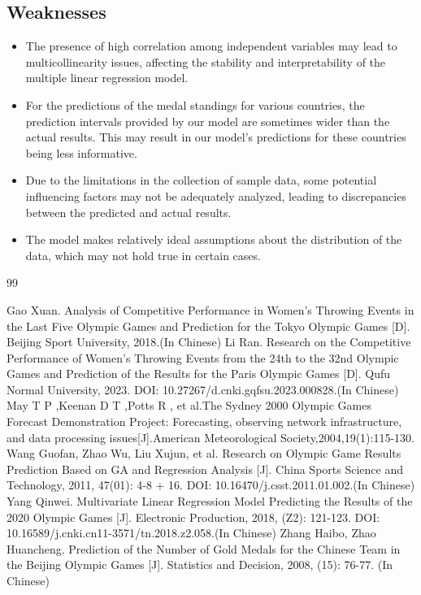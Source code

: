 \documentclass{mcmthesis}
\begin{document}
\subsection{Weaknesses}

\begin{itemize}
\item The presence of high correlation among independent variables may lead to multicollinearity issues, affecting the stability and interpretability of the multiple linear regression model.

\item For the predictions of the medal standings for various countries, the prediction intervals provided by our model are sometimes wider than the actual results. This may result in our model's predictions for these countries being less informative.

\item Due to the limitations in the collection of sample data, some potential influencing factors may not be adequately analyzed, leading to discrepancies between the predicted and actual results.

\item The model makes relatively ideal assumptions about the distribution of the data, which may not hold true in certain cases.
\end{itemize}

\begin{thebibliography}{99}

 Gao Xuan. Analysis of Competitive Performance in Women's Throwing Events in the Last Five Olympic Games and Prediction for the Tokyo Olympic Games [D]. Beijing Sport University, 2018.(In Chinese) 
 Li Ran. Research on the Competitive Performance of Women's Throwing Events from the 24th to the 32nd Olympic Games and Prediction of the Results for the Paris Olympic Games [D]. Qufu Normal University, 2023. DOI: 10.27267/d.cnki.gqfsu.2023.000828.(In Chinese) 
 May T P ,Keenan D T ,Potts R , et al.The Sydney 2000 Olympic Games Forecast Demonstration Project: Forecasting, observing network infrastructure, and data processing issues[J].American Meteorological Society,2004,19(1):115-130.
 Wang Guofan, Zhao Wu, Liu Xujun, et al. Research on Olympic Game Results Prediction Based on GA and Regression Analysis [J]. China Sports Science and Technology, 2011, 47(01): 4-8 + 16. DOI: 10.16470/j.csst.2011.01.002.(In Chinese) 
 Yang Qinwei. Multivariate Linear Regression Model Predicting the Results of the 2020 Olympic Games [J]. Electronic Production, 2018, (Z2): 121-123. DOI: 10.16589/j.cnki.cn11-3571/tn.2018.z2.058.(In Chinese)
 Zhang Haibo, Zhao Huancheng. Prediction of the Number of Gold Medals for the Chinese Team in the Beijing Olympic Games [J]. Statistics and Decision, 2008, (15): 76-77. (In Chinese)

\end{thebibliography}
\end{document}

